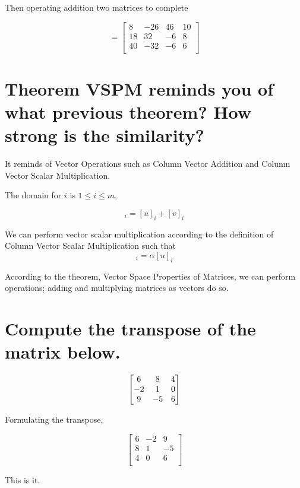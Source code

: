 \documentclass{article}
\begin{document}
Then operating addition two matrices to complete

\begin{equation}
  =
  \begin{bmatrix}
    8 & -26 & 46 & 10 \\
    18 & 32 & -6 & 8 \\
    40 & -32 & -6 & 6 \\
  \end{bmatrix}
\end{equation}

\bigskip

\section{Theorem VSPM reminds you of what previous theorem? How strong is the similarity?}

\sol

It reminds of Vector Operations such as Column Vector Addition
and Column Vector Scalar Multiplication.

The domain for \(i\) is \(1 \le i \le m\),

\begin{equation}
  [u+v]_i = [u]_i + [v]_i
\end{equation}

We can perform vector scalar multiplication according to the definition of Column Vector Scalar Multiplication such that
\begin{equation}
  [\alpha u]_i = \alpha[u]_i
\end{equation}

According to the theorem, Vector Space Properties of Matrices,
we can perform operations; adding and multiplying matrices as vectors do so.

\bigskip

\section{Compute the transpose of the matrix below.}

\[
\begin{bmatrix} 6 & 8 & 4 \\ -2 & 1 & 0 \\ 9 & -5 & 6 \\ \end{bmatrix}
\]

\sol

Formulating the transpose,

\begin{equation}
  \begin{bmatrix}
    6 & -2 & 9 \\
    8 & 1 & -5 \\
    4 & 0 & 6 \\
  \end{bmatrix}
\end{equation}

This is it.
\end{document}
